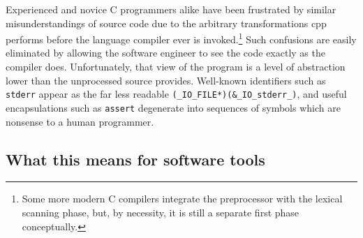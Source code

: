 \documentclass{article}
\newcommand{\Cpp}{\mbox{\textsf{cpp}}}
\newcommand{\C}{\mbox{\textsf{C}}}
\begin{document}
Experienced and novice \C{} programmers alike have been frustrated by
similar misunderstandings of source code due to the arbitrary
transformations \Cpp{} performs before the language compiler ever is
invoked.\footnote{Some more modern \C{} compilers integrate the
  preprocessor with the lexical scanning phase, but, by necessity, it is
  still a separate first phase conceptually.}  Such confusions are
easily eliminated by allowing the software engineer to see the code
exactly as the compiler does.  Unfortunately, that view of the program
is a level of abstraction lower than the unprocessed source provides.
Well-known identifiers such as \texttt{stderr} appear as the far less
readable \texttt{(\_IO\_FILE*)(\&\_IO\_stderr\_)},
and useful encapsulations such as \texttt{assert} degenerate into
sequences of symbols which are nonsense to a human programmer.


\subsection{What this means for software tools}
\end{document}
